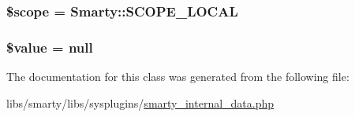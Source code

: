 \subsubsection[{\$scope}]{\setlength{\rightskip}{0pt plus 5cm}\$scope = {\bf Smarty\+::\+S\+C\+O\+P\+E\+\_\+\+L\+O\+C\+A\+L}}\label{class_smarty___variable_a2be0196776237c03bf3f5867c44317fc}
\hypertarget{class_smarty___variable_a0f298096f322952a72a50f98a74c7b60}{}
\subsubsection[{\$value}]{\setlength{\rightskip}{0pt plus 5cm}\$value = null}\label{class_smarty___variable_a0f298096f322952a72a50f98a74c7b60}


The documentation for this class was generated from the following file\+:\begin{DoxyCompactItemize}
\item 
libs/smarty/libs/sysplugins/\hyperlink{smarty__internal__data_8php}{smarty\+\_\+internal\+\_\+data.\+php}\end{DoxyCompactItemize}
